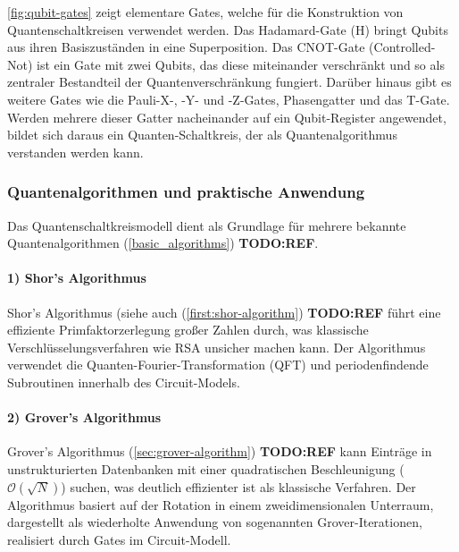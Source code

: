 \autoref{fig:qubit-gates} zeigt elementare Gates, welche für die Konstruktion von Quantenschaltkreisen verwendet werden. Das Hadamard-Gate (H) bringt Qubits aus ihren Basiszuständen in eine Superposition. Das CNOT-Gate (Controlled-Not) ist ein Gate mit zwei Qubits, das diese miteinander verschränkt und so als zentraler Bestandteil der Quantenverschränkung fungiert. Darüber hinaus gibt es weitere Gates wie die Pauli-X-, -Y- und -Z-Gates, Phasengatter und das T-Gate. Werden mehrere dieser Gatter nacheinander auf ein Qubit-Register angewendet, bildet sich daraus ein Quanten-Schaltkreis, der als Quantenalgorithmus verstanden werden kann. \autocite[174-188]{nielsen_quantum_2010}

\subsubsection*{Quantenalgorithmen und praktische Anwendung}

Das Quantenschaltkreismodell dient als Grundlage für mehrere bekannte Quantenalgorithmen (\autoref{basic_algorithms}) \textbf{TODO:REF}.
\\

\paragraph{1) Shor's Algorithmus}
Shor's Algorithmus (siehe auch (\autoref{first:shor-algorithm}) \textbf{TODO:REF} führt eine effiziente Primfaktorzerlegung großer Zahlen durch, was klassische Verschlüsselungsverfahren wie RSA unsicher machen kann. Der Algorithmus verwendet die Quanten-Fourier-Transformation (QFT) und periodenfindende Subroutinen innerhalb des Circuit-Models. \autocite[226-232]{nielsen_quantum_2010} \autocite{haywardQuantumComputingShors2005}
\\

\paragraph{2) Grover's Algorithmus}
Grover's Algorithmus (\autoref{sec:grover-algorithm}) \textbf{TODO:REF} kann Einträge in unstrukturierten Datenbanken mit einer quadratischen Beschleunigung (\( \mathcal{O}(\sqrt{N}) \)) suchen, was deutlich effizienter ist als klassische Verfahren. Der Algorithmus basiert auf der Rotation in einem zweidimensionalen Unterraum, dargestellt als wiederholte Anwendung von sogenannten Grover-Iterationen, realisiert durch Gates im Circuit-Modell. \autocite[248-254]{nielsen_quantum_2010}
\\

